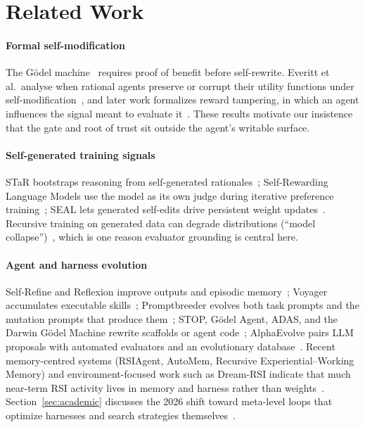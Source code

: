 \documentclass[11pt,a4paper]{article}
\begin{document}
\section{Related Work}\label{sec:related}
\paragraph{Formal self-modification} The G\"odel machine~\cite{schmidhuber2003} requires proof of benefit before self-rewrite. Everitt et al.\ analyse when rational agents preserve or corrupt their utility functions under self-modification~\cite{everitt2016}, and later work formalizes reward tampering, in which an agent influences the signal meant to evaluate it~\cite{everitt2019tamper}. These results motivate our insistence that the gate and root of trust sit outside the agent's writable surface.

\paragraph{Self-generated training signals} STaR bootstraps reasoning from self-generated rationales~\cite{zelikman2022star}; Self-Rewarding Language Models use the model as its own judge during iterative preference training~\cite{yuan2024selfreward}; SEAL lets generated self-edits drive persistent weight updates~\cite{zweiger2025seal}. Recursive training on generated data can degrade distributions (``model collapse'')~\cite{shumailov2024collapse}, which is one reason evaluator grounding is central here.

\paragraph{Agent and harness evolution} Self-Refine and Reflexion improve outputs and episodic memory~\cite{madaan2023,shinn2023}; Voyager accumulates executable skills~\cite{wang2023voyager}; Promptbreeder evolves both task prompts and the mutation prompts that produce them~\cite{fernando2023promptbreeder}; STOP, G\"odel Agent, ADAS, and the Darwin G\"odel Machine rewrite scaffolds or agent code~\cite{zelikman2023stop,yin2024godelagent,hu2024adas,zhang2025dgm}; AlphaEvolve pairs LLM proposals with automated evaluators and an evolutionary database~\cite{alphaevolve2025}. Recent memory-centred systems (RSIAgent, AutoMem, Recursive Experiential--Working Memory) and environment-focused work such as Dream-RSI indicate that much near-term RSI activity lives in memory and harness rather than weights~\cite{zhu2026rsiagent,du2026automem,yu2026recuris,zheng2026dreamrsi}. Section~\ref{sec:academic} discusses the 2026 shift toward meta-level loops that optimize harnesses and search strategies themselves~\cite{lee2026metaharness,zhang2026hyperagents,liu2026evox}.
\end{document}
